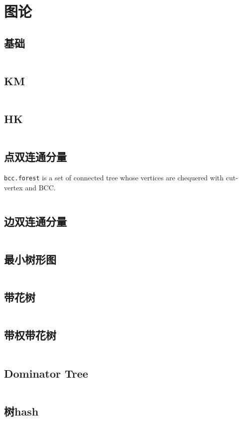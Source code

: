 \chapter{图论}
\section{基础}
\inputminted{cpp}{\source/graph-theory/basis.cpp}
\section{KM}
\inputminted{cpp}{\source/graph-theory/KM.cpp}
\section{HK}
\inputminted{cpp}{\source/graph-theory/Hopcroft-Karp.cpp}
\section{点双连通分量}
\texttt{bcc.forest} is a set of connected tree whose vertices are chequered with cut-vertex and BCC.
\inputminted{cpp}{\source/graph-theory/biconnected-graph-vertex.cpp}
\section{边双连通分量}
\inputminted{cpp}{\source/graph-theory/biconnected-graph-edge.cpp}
\section{最小树形图}
\inputminted{cpp}{\source/graph-theory/optimum-branching.cpp}
\section{带花树}
\inputminted{cpp}{\source/graph-theory/blossom-algorithm.cpp}
\section{带权带花树}
\inputminted{cpp}{\source/graph-theory/weighted_blossom.cpp}
\section{Dominator Tree}
\inputminted{cpp}{\source/graph-theory/dominator-tree.cpp}
\section{树hash}
\inputminted{cpp}{\source/graph-theory/tree_hash.cpp}
